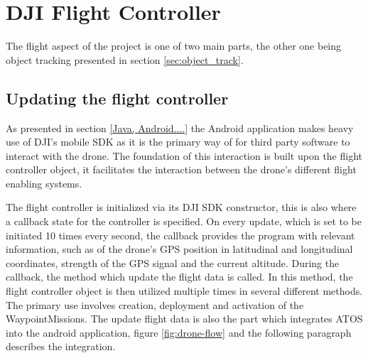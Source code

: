 \section{DJI Flight Controller} \label{sec:DJI_flight_controll}
The flight aspect of the project is one of two main parts, the other one being object tracking presented in section \ref{sec:object_track}.

\subsection{Updating the flight controller}
As presented in section \ref{Java, Android....} the Android application makes heavy use of DJI's mobile SDK as it is the primary way of for third party software to interact with the drone. The foundation of this interaction is built upon the flight controller object, it facilitates the interaction between the drone's different flight enabling systems. 
\newline

The flight controller is initialized via its DJI SDK constructor, this is also where a callback state for the controller is specified. On every update, which is set to be initiated 10 times every second, the callback provides the program with relevant information, such as of the drone's GPS position in latitudinal and longitudinal coordinates, strength of the GPS signal and the current altitude. During the callback, the method which update the flight data is called. In this method, the flight controller object is then utilized multiple times in several different methods. The primary use involves creation, deployment and activation of the WaypointMissions. The update flight data is also the part which integrates ATOS into the android application, figure \ref{fig:drone-flow} and the following paragraph describes the integration. 

